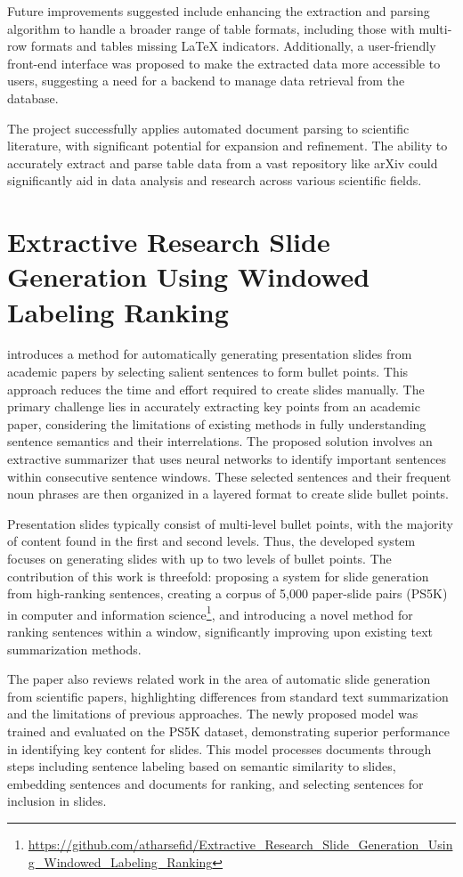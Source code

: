 Future improvements suggested include enhancing the extraction and parsing algorithm to handle a broader range of table formats, including those with multi-row formats and tables missing \LaTeX{} indicators. Additionally, a user-friendly front-end interface was proposed to make the extracted data more accessible to users, suggesting a need for a backend to manage data retrieval from the database.

The project successfully applies automated document parsing to scientific literature, with significant potential for expansion and refinement. The ability to accurately extract and parse table data from a vast repository like arXiv could significantly aid in data analysis and research across various scientific fields.


\section{Extractive Research Slide Generation Using Windowed Labeling Ranking}

\citet{Sefid:2021:arXiv} introduces a method for automatically generating presentation slides from academic papers by selecting salient sentences to form bullet points. This approach reduces the time and effort required to create slides manually. The primary challenge lies in accurately extracting key points from an academic paper, considering the limitations of existing methods in fully understanding sentence semantics and their interrelations. The proposed solution involves an extractive summarizer that uses neural networks to identify important sentences within consecutive sentence windows. These selected sentences and their frequent noun phrases are then organized in a layered format to create slide bullet points.

Presentation slides typically consist of multi-level bullet points, with the majority of content found in the first and second levels. Thus, the developed system focuses on generating slides with up to two levels of bullet points. The contribution of this work is threefold: proposing a system for slide generation from high-ranking sentences, creating a corpus of 5,000 paper-slide pairs (PS5K) in computer and information science\footnote{\url{https://github.com/atharsefid/Extractive_Research_Slide_Generation_Using_Windowed_Labeling_Ranking}}, and introducing a novel method for ranking sentences within a window, significantly improving upon existing text summarization methods.

The paper also reviews related work in the area of automatic slide generation from scientific papers, highlighting differences from standard text summarization and the limitations of previous approaches. The newly proposed model was trained and evaluated on the PS5K dataset, demonstrating superior performance in identifying key content for slides. This model processes documents through steps including sentence labeling based on semantic similarity to slides, embedding sentences and documents for ranking, and selecting sentences for inclusion in slides.

